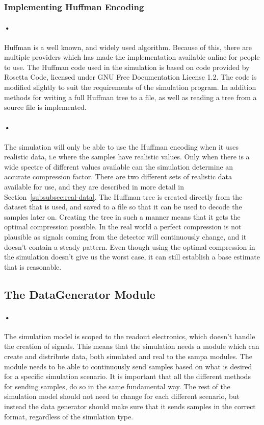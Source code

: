 \documentclass[a4paper, 12pt]{report}
\begin{document}
\subsubsection{Implementing Huffman Encoding}

\paragraph{•}
Huffman is a well known, and widely used algorithm.
Because of this, there are multiple providers which has made the implementation available online for people to use.
The Huffman code used in the simulation is based on code provided by Rosetta Code, licensed under GNU Free Documentation License 1.2\cite{rosetta}\cite{gnu}.
The code is modified slightly to suit the requirements of the simulation program.
In addition methods for writing a full Huffman tree to a file, as well as reading a tree from a source file is implemented.

\paragraph{•}
The simulation will only be able to use the Huffman encoding when it uses realistic data, i.e where the samples have realistic values.
Only when there is a wide spectre of different values available can the simulation determine an accurate compression factor.
There are two different sets of realistic data available for use, and they are described in more detail in Section~\ref{subsubsec:real-data}.
The Huffman tree is created directly from the dataset that is used, and saved to a file so that it can be used to decode the samples later on.
Creating the tree in such a manner means that it gets the optimal compression possible.
In the real world a perfect compression is not plausible as signals coming from the detector will continuously change, and it doesn't contain a steady pattern.
Even though using the optimal compression in the simulation doesn't give us the worst case, it can still establish a base estimate that is reasonable.

\subsection{The DataGenerator Module}
\paragraph{•}
The simulation model is scoped to the readout electronics, which doesn't handle the creation of signals.
This means that the simulation needs a module which can create and distribute data, both simulated and real to the \gls{sampa} modules.
The module needs to be able to continuously send samples based on what is desired for a specific simulation scenario.
It is important that all the different methods for sending samples, do so in the same fundamental way.
The rest of the simulation model should not need to change for each different scenario, but instead the data generator should make sure that it sends samples in the correct format, regardless of the simulation type.
\end{document}
